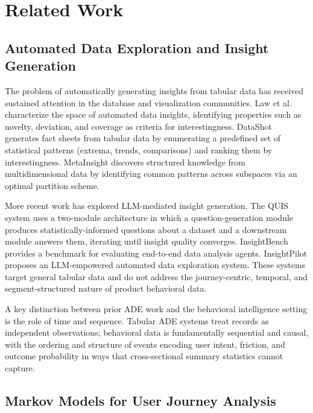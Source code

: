 \documentclass[12pt, a4paper]{article}
\begin{document}
\section{Related Work}
\label{sec:related}

\subsection{Automated Data Exploration and Insight Generation}

The problem of automatically generating insights from tabular data has received sustained attention in the database and visualization communities. Law et al.\ \cite{law2020} characterize the space of automated data insights, identifying properties such as novelty, deviation, and coverage as criteria for interestingness. DataShot \cite{xu2020} generates fact sheets from tabular data by enumerating a predefined set of statistical patterns (extrema, trends, comparisons) and ranking them by interestingness. MetaInsight \cite{ma2021} discovers structured knowledge from multidimensional data by identifying common patterns across subspaces via an optimal partition scheme.

More recent work has explored LLM-mediated insight generation. The QUIS system \cite{manatkar2024} uses a two-module architecture in which a question-generation module produces statistically-informed questions about a dataset and a downstream module answers them, iterating until insight quality converges. InsightBench \cite{sahu2024} provides a benchmark for evaluating end-to-end data analysis agents. InsightPilot \cite{ma2023} proposes an LLM-empowered automated data exploration system. These systems target general tabular data and do not address the journey-centric, temporal, and segment-structured nature of product behavioral data.

A key distinction between prior ADE work and the behavioral intelligence setting is the role of time and sequence. Tabular ADE systems treat records as independent observations; behavioral data is fundamentally sequential and causal, with the ordering and structure of events encoding user intent, friction, and outcome probability in ways that cross-sectional summary statistics cannot capture.

\subsection{Markov Models for User Journey Analysis}
\end{document}

